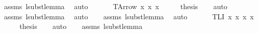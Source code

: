 \begin{isabellebody}
\ assms{\isacharparenleft}{\kern0pt}{}{\isacharcomma}{\kern0pt}{}{\isacharcomma}{\kern0pt}{}{\isacharcomma}{\kern0pt}{}{\isacharparenright}{\kern0pt}\ lsubst{\isacharunderscore}{\kern0pt}lemma{}\ \isamarkupfalse%
\ auto{\isacharbrackleft}{\kern0pt}{}{\isacharbrackright}{\kern0pt}\isanewline
\ \ \isamarkupfalse%
\isanewline
{}\isamarkupfalse%
\isanewline
\ \ \isamarkupfalse%
\ {\isacharparenleft}{\kern0pt}TArrow\ x{}{}\ x{}{}\ x{}{}{\isacharparenright}{\kern0pt}\isanewline
\ \ \isamarkupfalse%
\ \isamarkupfalse%
\ {\isacharquery}{\kern0pt}thesis\isanewline
\ \ \isamarkupfalse%
\ auto\isanewline
\ \ \isamarkupfalse%
\ assms{\isacharparenleft}{\kern0pt}{}{\isacharcomma}{\kern0pt}{}{\isacharcomma}{\kern0pt}{}{\isacharcomma}{\kern0pt}{}{\isacharparenright}{\kern0pt}\ lsubst{\isacharunderscore}{\kern0pt}lemma{}\ \isamarkupfalse%
\ auto{\isacharbrackleft}{\kern0pt}{}{\isacharbrackright}{\kern0pt}\isanewline
\ \ \isamarkupfalse%
\ assms{\isacharparenleft}{\kern0pt}{}{\isacharcomma}{\kern0pt}{}{\isacharcomma}{\kern0pt}{}{\isacharcomma}{\kern0pt}{}{\isacharparenright}{\kern0pt}\ lsubst{\isacharunderscore}{\kern0pt}lemma{}\ \isamarkupfalse%
\ auto{\isacharbrackleft}{\kern0pt}{}{\isacharbrackright}{\kern0pt}\isanewline
\ \ \isamarkupfalse%
\isanewline
{}\isamarkupfalse%
\isanewline
\ \ \isamarkupfalse%
\ {\isacharparenleft}{\kern0pt}TLI\ x{}{}\ x{}{}\ x{}{}\ x{}{}{\isacharparenright}{\kern0pt}\isanewline
\ \ \isamarkupfalse%
\ \isamarkupfalse%
\ {\isacharquery}{\kern0pt}thesis\isanewline
\ \ \isamarkupfalse%
\ auto\isanewline
\ \ \isamarkupfalse%
\ assms{\isacharparenleft}{\kern0pt}{}{\isacharcomma}{\kern0pt}{}{\isacharcomma}{\kern0pt}{}{\isacharcomma}{\kern0pt}{}{\isacharparenright}{\kern0pt}\ lsubst{\isacharunderscore}{\kern0pt}lemma{}\ \isamarkupfalse%

\end{isabellebody}
